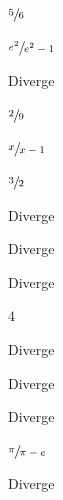 \begin{exercises}
\begin{exercise}
\begin{answer}
\begin{alphalist}[3]
      \item $\sfrac{5}{6}$
      \item $\sfrac{e^2}{e^2-1}$
      \item Diverge
      \item $\sfrac{2}{9}$
      \item $\sfrac{x}{x-1}$
      \item $\sfrac{3}{2}$
      \item Diverge
      \item Diverge
      \item Diverge
      \item $4$
      \item Diverge
      \item Diverge
      \item Diverge
      \item $\sfrac{\pi}{\pi-e}$
      \item Diverge
    \end{alphalist}
  \end{answer}
\end{exercise}




\end{exercises}
